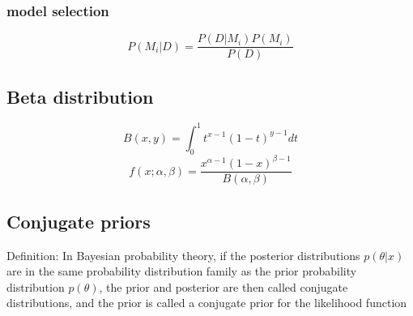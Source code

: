\documentclass[12pt,a4paper]{article}
\begin{document}
\subsubsection*{model selection}
$$
P(M_i|D) = \frac{P(D|M_i)P(M_i)}{P(D)}
$$
\subsection*{Beta distribution}
$$
B(x,y) = \int_0^1{t^{x-1}(1-t)^{y-1}}dt
$$
$$
f(x;\alpha,\beta) = \frac{x^{\alpha-1}(1-x)^{\beta-1}}{B(\alpha,\beta)}
$$
\subsection*{Conjugate priors}
Definition: In Bayesian probability theory, if the posterior distributions $p(\theta | x)$ are in the same probability distribution family as the prior probability distribution $p(\theta)$, the prior and posterior are then called conjugate distributions, and the prior is called a conjugate prior for the likelihood function
\end{document}
